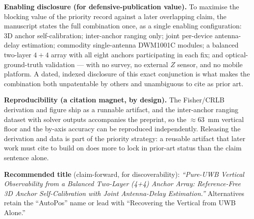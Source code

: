 \documentclass[11pt,a4paper]{article}
\begin{document}
\textbf{Enabling disclosure (for defensive-publication value).} To maximise the blocking value of the
priority record against a later overlapping claim, the manuscript states the full combination once, as
a single enabling configuration: 3D anchor self-calibration; inter-anchor ranging only; joint
per-device antenna-delay estimation; commodity single-antenna DWM1001C modules; a balanced two-layer
$4{+}4$ array with all eight anchors participating in each fix; and optical-ground-truth validation --- with no survey, no external $Z$ sensor, and no
mobile platform. A dated, indexed disclosure of this exact conjunction is what makes the combination
both unpatentable by others and unambiguous to cite as prior art.

\textbf{Reproducibility (a citation magnet, by design).} The Fisher/CRLB derivation and figure ship as
a runnable artifact, and the inter-anchor
ranging dataset with solver outputs accompanies the preprint, so the ${\approx}63$~mm vertical floor
and the by-axis accuracy can be reproduced independently. Releasing the derivation and data is part of
the priority strategy: a reusable artifact that later work must cite to build on does more to lock in
prior-art status than the claim sentence alone.

\textbf{Recommended title} (claim-forward, for discoverability):
\emph{``Pure-UWB Vertical Observability from a Balanced Two-Layer (4+4) Anchor Array: Reference-Free 3D
Anchor Self-Calibration with Joint Antenna-Delay Estimation.''} Alternatives retain the ``AutoPos''
name or lead with ``Recovering the Vertical from UWB Alone.''
\end{document}

